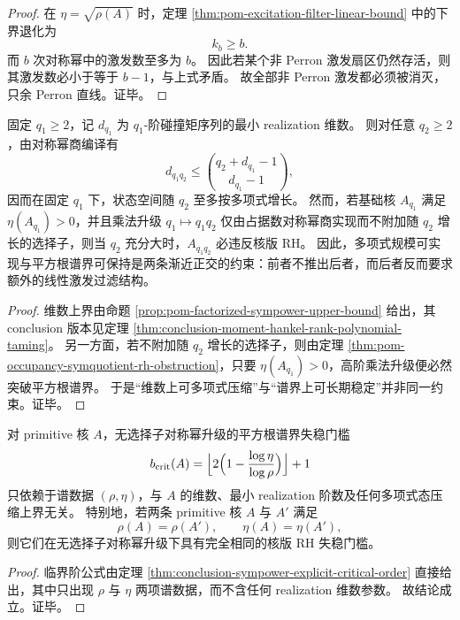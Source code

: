 \begin{proof}
在 \(\eta=\sqrt{\rho(A)}\) 时，定理 \ref{thm:pom-excitation-filter-linear-bound} 中的下界退化为
\[
k_b\ge b.
\]
而 \(b\) 次对称幂中的激发数至多为 \(b\)。
因此若某个非 Perron 激发扇区仍然存活，则其激发数必小于等于 \(b-1\)，与上式矛盾。
故全部非 Perron 激发都必须被消灭，只余 Perron 直线。证毕。
\end{proof}

\begin{theorem}[多项式态压缩与平方根谱稳定是两条渐近正交约束]\label{thm:conclusion-polynomial-compression-vs-sqrt-stability-orthogonal}
固定 \(q_1\ge 2\)，记 \(d_{q_1}\) 为 \(q_1\)-阶碰撞矩序列的最小 realization 维数。
则对任意 \(q_2\ge 2\)，由对称幂商编译有
\[
d_{q_1q_2}\le \binom{q_2+d_{q_1}-1}{d_{q_1}-1},
\]
因而在固定 \(q_1\) 下，状态空间随 \(q_2\) 至多按多项式增长。
然而，若基础核 \(A_{q_1}\) 满足 \(\eta(A_{q_1})>0\)，并且乘法升级 \(q_1\mapsto q_1q_2\) 仅由占据数对称幂商实现而不附加随 \(q_2\) 增长的选择子，则当 \(q_2\) 充分大时，\(A_{q_1q_2}\) 必违反核版 RH。
因此，多项式规模可实现与平方根谱界可保持是两条渐近正交的约束：前者不推出后者，而后者反而要求额外的线性激发过滤结构。
\end{theorem}

\begin{proof}
维数上界由命题 \ref{prop:pom-factorized-sympower-upper-bound} 给出，其 conclusion 版本见定理 \ref{thm:conclusion-moment-hankel-rank-polynomial-taming}。
另一方面，若不附加随 \(q_2\) 增长的选择子，则由定理 \ref{thm:pom-occupancy-symquotient-rh-obstruction}，只要 \(\eta(A_{q_1})>0\)，高阶乘法升级便必然突破平方根谱界。
于是“维数上可多项式压缩”与“谱界上可长期稳定”并非同一约束。证毕。
\end{proof}

\begin{corollary}\label{cor:conclusion-selector-free-threshold-independent-of-realization-dimension}
对 primitive 核 \(A\)，无选择子对称幂升级的平方根谱界失稳门槛
\[
b_{\mathrm{crit}}(A)=
\Bigl\lfloor 2\Bigl(1-\frac{\log \eta}{\log \rho}\Bigr)\Bigr\rfloor+1
\]
只依赖于谱数据 \((\rho,\eta)\)，与 \(A\) 的维数、最小 realization 阶数及任何多项式态压缩上界无关。
特别地，若两条 primitive 核 \(A\) 与 \(A'\) 满足
\[
\rho(A)=\rho(A'),
\qquad
\eta(A)=\eta(A'),
\]
则它们在无选择子对称幂升级下具有完全相同的核版 RH 失稳门槛。
\end{corollary}

\begin{proof}
临界阶公式由定理 \ref{thm:conclusion-sympower-explicit-critical-order} 直接给出，其中只出现 \(\rho\) 与 \(\eta\) 两项谱数据，而不含任何 realization 维数参数。
故结论成立。证毕。
\end{proof}

